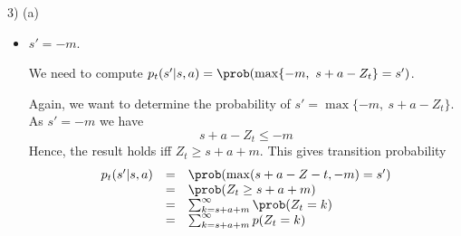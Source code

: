 \documentclass[11pt,a4paper]{article}
\begin{document}
\begin{answer}{3) (a)}
\begin{itemize}
\begin{itemize}
      \item $s'=-m$.
      \par We need to compute $p_t(s'|s,a)=\prob(\max\{-m,\ s+a-Z_t\}=s')$.
      \par Again, we want to determine the probability of $s'=\max\{-m,\ s+a-Z_t\}$. As $s'=-m$ we have
      \[ s+a-Z_t\leq-m \]
      Hence, the result holds iff $Z_t\geq s+a+m$. This gives transition probability
      \[\begin{array}{rcl}
        p_t(s'|s,a)&=&\prob(\max(s+a-Z-t,-m)=s')\\
        &=&\prob(Z_t\geq s+a+m)\\
        &=&\sum_{k=s+a+m}^\infty\prob(Z_t=k)\\
        &=&\sum_{k=s+a+m}^\infty p(Z_t=k)
      \end{array}\]
    \end{itemize}


\end{itemize}
\end{answer}
\end{document}
